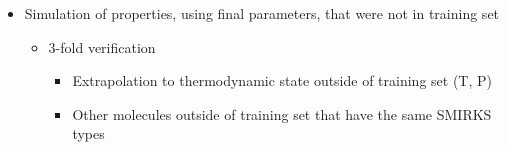 \documentclass[aps,pre,nofootinbib,superscriptaddress,linenumbers,10pt, draft,tightenlines]{revtex4-1}
\begin{document}
\begin{itemize}
\begin{itemize}
\begin{itemize}
        \end{itemize} 
    	\item Simulation of properties, using final parameters, that 
    	      were not in training set %
    	\begin{itemize}
    		\item 3-fold verification
    		\begin{itemize}
    			\item Extrapolation to thermodynamic state outside of training set (T, P)
    			\item Other molecules outside of training set that have the same SMIRKS types
    		\end{itemize}    		
    	\end{itemize} 
    \end{itemize}
\end{itemize}

 

\end{document}
